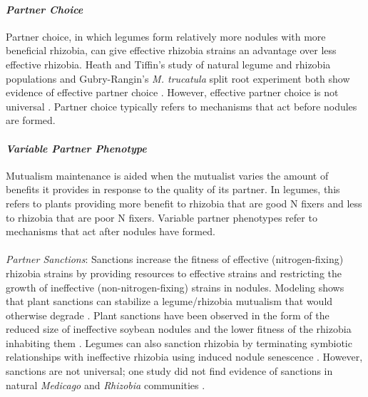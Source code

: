 \documentclass[12pt]{article}
\begin{document}
\begin{doublespace}
 \paragraph{\textit{Partner Choice}} Partner choice, in which legumes form relatively more nodules with more beneficial rhizobia, can give effective rhizobia strains an advantage over less effective rhizobia. Heath and Tiffin's study of natural legume and rhizobia populations and Gubry-Rangin's \textit{M. trucatula} split root experiment both show evidence of effective partner choice \cite{Heath2007,Gubry-Rangin2010}. However, effective partner choice is not universal \cite{Amarger1981}. Partner choice typically refers to mechanisms that act before nodules are formed.
 \paragraph {\textit{Variable Partner Phenotype}}
 Mutualism maintenance is aided when the mutualist varies the amount of benefits it provides in response to the quality of its partner. In legumes, this refers to plants providing more benefit to rhizobia that are good N fixers and less to rhizobia that are poor N fixers. Variable partner phenotypes refer to mechanisms that act after nodules have formed.
 \paragraph {} 
 \textit{Partner Sanctions}: 
 Sanctions increase the fitness of effective (nitrogen-fixing) rhizobia strains by providing resources to effective strains and restricting the growth of ineffective (non-nitrogen-fixing) strains in nodules. Modeling shows that plant sanctions can stabilize a legume/rhizobia mutualism that would otherwise degrade \cite{West2002}. Plant sanctions have been observed in the form of the reduced size of ineffective soybean nodules and the lower fitness of the rhizobia inhabiting them \cite{Kiers2003,Singleton1983}. Legumes can also sanction rhizobia by terminating symbiotic relationships with ineffective rhizobia using induced nodule senescence \cite{Regus2017}. However, sanctions are not universal; one study did not find evidence of sanctions in natural \textit{Medicago} and \textit{Rhizobia} communities \cite{Heath2009}. 

\end{doublespace}
\end{document}
